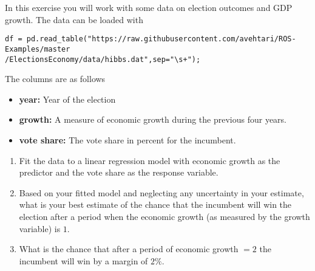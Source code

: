 \begin{exercise}
In this exercise you will work with some data on election outcomes and GDP growth. The data can be loaded with 
\begin{Verbatim}
df = pd.read_table("https://raw.githubusercontent.com/avehtari/ROS-Examples/master
/ElectionsEconomy/data/hibbs.dat",sep="\s+");
\end{Verbatim}
The columns are as follows
\begin{itemize}
\item {\bf year:} Year of the election
\item {\bf growth:} A measure of economic growth during the previous four years. 
\item {\bf vote share:} The vote share in percent for the incumbent. 
\end{itemize}
\begin{enumerate}[label=(\alph*)]
\item Fit the data to a linear regression model with economic growth as the predictor and the vote share as the response variable.
\item Based on your fitted model and neglecting any uncertainty in your estimate, what is your best estimate of the chance that the incumbent will win the election after a period when the economic growth (as measured by the growth variable) is $1$. 
\item What is the chance that after a period of economic growth $=2$ the incumbent will win by a margin of $2\%$. 
\end{enumerate}

\end{exercise}





